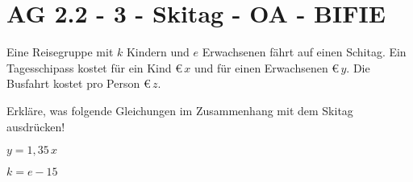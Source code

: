 \section{AG 2.2 - 3 - Skitag  - OA - BIFIE}

\begin{beispiel}[AG 2.2]{1} %
	
	Eine Reisegruppe mit $k$ Kindern und $e$ Erwachsenen fährt auf einen Schitag. Ein Tagesschipass kostet für ein Kind \euro\,$x$ und für einen Erwachsenen \euro\,$y$. Die Busfahrt kostet pro Person \euro\,$z$. 

\leer

Erkläre, was folgende Gleichungen im Zusammenhang mit dem Skitag ausdrücken!

$y=1,35\,x \quad$ 	\leer

$k=e-15 \quad$ 
\end{beispiel}